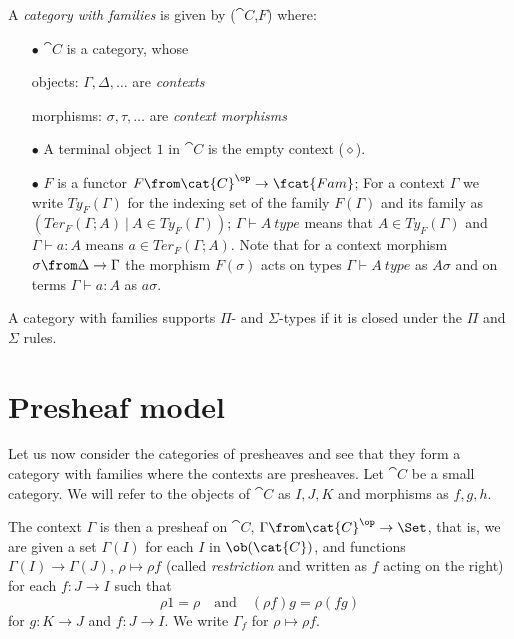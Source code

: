 \begin{definition}
A \emph{category with families} is given by ($\cat{C}$,$F$) where:

\begin{itemize}
  \item[$\bullet$] $\cat{C}$ is a category, whose

    objects: $\Gamma, \Delta, \dots$ are \emph{contexts}

    morphisms:  $\sigma, \tau, \dots$ are \emph{context morphisms}

  \item[$\bullet$] A terminal object $1$ in $\cat{C}$ is the empty context ($\diamond$).

  \item[$\bullet$] $F$ is a functor $F\from \cat{C}^\op \to \fcat{Fam}$; For a
    context $\Gamma$ we write $Ty_F(\Gamma)$ for the indexing set of the family
    $F(\Gamma)$ and its family as $(Ter_F(\Gamma;A)~|~A \in Ty_F(\Gamma))$;
    $\Gamma \vdash A~type$ means that $A \in Ty_F(\Gamma)$ and $\Gamma \vdash a
    : A$ means $a \in Ter_F(\Gamma;A)$. Note that for a context morphism
    $\sigma \from \Delta \to \Gamma$ the morphism $F(\sigma)$ acts on types
    $\Gamma \vdash A~type$ as $A\sigma$ and on terms $\Gamma \vdash a : A$ as
    $a\sigma$.
\end{itemize}
\end{definition}

A category with families supports $\Pi$- and $\Sigma$-types if it is
closed under the $\Pi$ and $\Sigma$ rules.

\section*{Presheaf model}

Let us now consider the categories of presheaves and see that they form a
category with families where the contexts are presheaves.  Let $\cat{C}$ be a
small category. We will refer to the objects of $\cat{C}$  as $I,J,K$ and
morphisms as $f,g,h$.

The context $\Gamma$ is then a presheaf on $\cat{C}$, $\Gamma \from \cat{C}^\op
\to \Set$, that is, we are given a set $\Gamma(I)$ for each $I$ in
$\ob(\cat{C})$, and functions $\Gamma(I) \to \Gamma(J)$, $\rho \mapsto \rho f$
(called \emph{restriction} and written as $f$ acting on the right) for each $f:
J \to I$ such that
\[
  \rho 1 = \rho \quad \text{and} \quad (\rho f) g = \rho (f g)
\]
for $g: K \to J$ and $f: J \to I$. We write $\Gamma_f$ for $\rho \mapsto \rho
f$.

